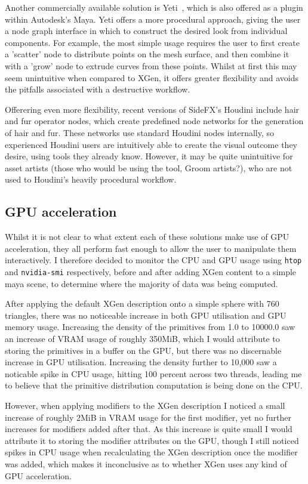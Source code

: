 \documentclass[]{acmsiggraph}
\begin{document}
Another commercially available solution is Yeti~\cite{yeti}, which is also offered as a plugin within Autodesk's Maya. Yeti offers a more procedural approach, giving the user a node graph interface in which to construct the desired look from individual components. For example, the most simple usage requires the user to first create a 'scatter' node to distribute points on the mesh surface, and then combine it with a 'grow' node to extrude curves from these points. Whilst at first this may seem unintuitive when compared to XGen, it offers greater flexibility and avoids the pitfalls associated with a destructive workflow.

Offerering even more flexibility, recent versions of SideFX's Houdini include hair and fur operator nodes, which create predefined node networks for the generation of hair and fur. These networks use standard Houdini nodes internally, so experienced Houdini users are intuitively able to create the visual outcome they desire, using tools they already know. However, it may be quite unintuitive for asset artists (those who would be using the tool, Groom artists?), who are not used to Houdini's heavily procedural workflow.

\subsection{GPU acceleration} \label{sec:existingGPU}
Whilst it is not clear to what extent each of these solutions make use of GPU acceleration, they all perform fast enough to allow the user to manipulate them interactively. I therefore decided to monitor the CPU and GPU usage using \verb|htop| and \verb|nvidia-smi| respectively, before and after adding XGen content to a simple maya scene, to determine where the majority of data was being computed.

After applying the default XGen description onto a simple sphere with 760 triangles, there was no noticeable increase in both GPU utilisation and GPU memory usage. Increasing the density of the primitives from 1.0 to 10000.0 saw an increase of VRAM usage of roughly 350MiB, which I would attribute to storing the primitives in a buffer on the GPU, but there was no discernable increase in GPU utilisation. Increasing the density further to 10,000 saw a noticable spike in CPU usage, hitting 100 percent across two threads, leading me to believe that the primitive distribution computation is being done on the CPU.

However, when applying modifiers to the XGen description I noticed a small increase of roughly 2MiB in VRAM usage for the first modifier, yet no further increases for modifiers added after that. As this increase is quite small I would attribute it to storing the modifier attributes on the GPU, though I still noticed spikes in CPU usage when recalculating the XGen description once the modifier was added, which makes it inconclusive as to whether XGen uses any kind of GPU acceleration.
\end{document}
